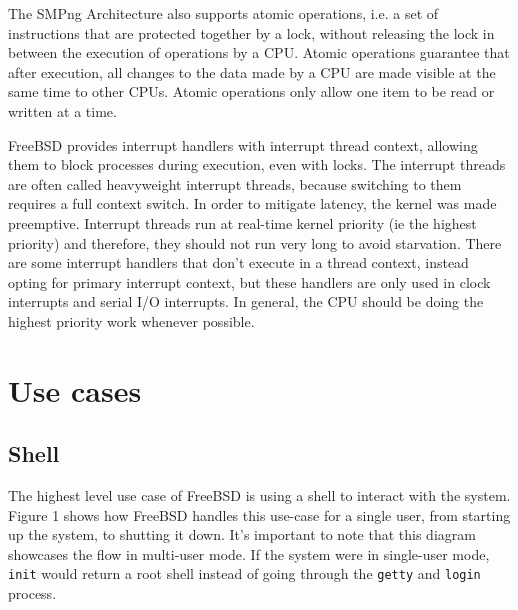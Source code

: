 \documentclass[12pt, dvipsnames, a4paper]{article}
\newcommand{\code}[1]{\texttt{#1}}
\begin{document}
The SMPng Architecture also supports atomic operations, i.e. a set of instructions that are protected together by a lock, without releasing the lock in between the execution of operations by a CPU. Atomic operations guarantee that after execution, all changes to the data made by a CPU are made visible at the same time to other CPUs. Atomic operations only allow one item to be read or written at a time.

FreeBSD provides interrupt handlers with interrupt thread context, allowing them to block processes during execution, even with locks. The interrupt threads are often called heavyweight interrupt threads, because switching to them requires a full context switch. In order to mitigate latency, the kernel was made preemptive. Interrupt threads run at real-time kernel priority (ie the highest priority) and therefore, they should not run very long to avoid starvation. There are some interrupt handlers that don’t execute in a thread context, instead opting for primary interrupt context, but these handlers are only used in clock interrupts and serial I/O interrupts. In general, the CPU should be doing the highest priority work whenever possible.

\clearpage
\section{Use cases}
\subsection{Shell}
The highest level use case of FreeBSD is using a shell to interact with the system.
Figure 1 shows how FreeBSD handles this use-case for a single user,
from starting up the system, to shutting it down. It's important to note that
this diagram showcases the flow in multi-user mode. If the system were in
single-user mode, \code{init} would return a root shell instead of going through the
\code{getty} and \code{login} process\cite{bootprocess}\cite{init}.
\end{document}
